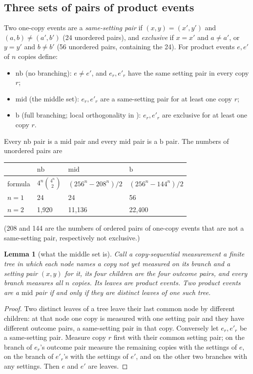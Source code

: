 \documentclass[11pt,a4paper]{article}
\newtheorem{lemma}[theorem]{Lemma}
\theoremstyle{definition}
\theoremstyle{remark}
\newcommand{\nb}{\mathrm{nb}}
\newcommand{\md}{\mathrm{mid}}
\newcommand{\br}{\mathrm{b}}
\begin{document}
\subsection{Three sets of pairs of product events}

Two one-copy events are a \emph{same-setting pair} if $(x, y) = (x', y')$ and $(a, b) \neq (a', b')$ (24 unordered pairs), and \emph{exclusive} if $x = x'$ and $a \neq a'$, or $y = y'$ and $b \neq b'$ (56 unordered pairs, containing the 24). For product events $e, e'$ of $n$ copies define:
\begin{itemize}
  \item $\nb$ (no branching): $e \neq e'$, and $e_r, e'_r$ have the same setting pair in every copy $r$;
  \item $\md$ (the middle set): $e_r, e'_r$ are a same-setting pair for at least one copy $r$;
  \item $\br$ (full branching; local orthogonality in \cite{R7}): $e_r, e'_r$ are exclusive for at least one copy $r$.
\end{itemize}
Every $\nb$ pair is a $\md$ pair and every $\md$ pair is a $\br$ pair. The numbers of unordered pairs are
\begin{center}
\begin{tabular}{llll}
\toprule
 & $\nb$ & $\md$ & $\br$ \\
\midrule
formula & $4^n \binom{4^n}{2}$ & $(256^n - 208^n)/2$ & $(256^n - 144^n)/2$ \\
$n = 1$ & 24 & 24 & 56 \\
$n = 2$ & 1{,}920 & 11{,}136 & 22{,}400 \\
\bottomrule
\end{tabular}
\end{center}
(208 and 144 are the numbers of ordered pairs of one-copy events that are not a same-setting pair, respectively not exclusive.)

\begin{lemma}[what the middle set is]\label{l:mid}
Call a \emph{copy-sequential measurement} a finite tree in which each node names a copy not yet measured on its branch and a setting pair $(x, y)$ for it, its four children are the four outcome pairs, and every branch measures all $n$ copies. Its leaves are product events. Two product events are a $\md$ pair if and only if they are distinct leaves of one such tree.
\end{lemma}

\begin{proof}
Two distinct leaves of a tree leave their last common node by different children: at that node one copy is measured with one setting pair and they have different outcome pairs, a same-setting pair in that copy. Conversely let $e_r, e'_r$ be a same-setting pair. Measure copy $r$ first with their common setting pair; on the branch of $e_r$'s outcome pair measure the remaining copies with the settings of $e$, on the branch of $e'_r$'s with the settings of $e'$, and on the other two branches with any settings. Then $e$ and $e'$ are leaves.
\end{proof}
\end{document}
